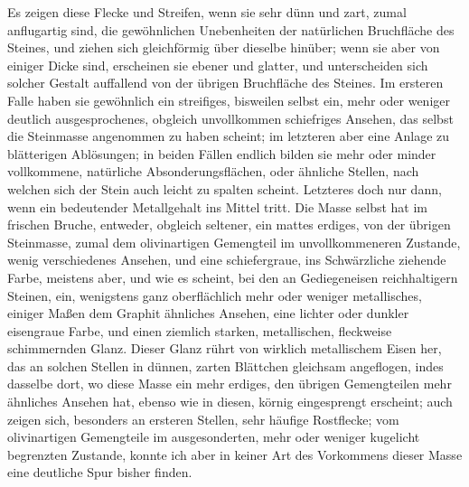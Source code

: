 \documentclass[a4paper, 11pt, oneside, german]{article}
\begin{document}
Es zeigen diese Flecke und Streifen, wenn sie sehr dünn und zart, zumal anflugartig sind, die gewöhnlichen Unebenheiten der natürlichen Bruchfläche des Steines, und ziehen sich gleichförmig über dieselbe hinüber; wenn sie aber von einiger Dicke sind, erscheinen sie ebener und glatter, und unterscheiden sich solcher Gestalt auffallend von der übrigen Bruchfläche des Steines. Im ersteren Falle haben sie gewöhnlich ein streifiges, bisweilen selbst ein, mehr oder weniger deutlich ausgesprochenes, obgleich unvollkommen schiefriges Ansehen, das selbst die Steinmasse angenommen zu haben scheint; im letzteren aber eine Anlage zu blätterigen Ablösungen; in beiden Fällen endlich bilden sie mehr oder minder vollkommene, natürliche Absonderungsflächen, oder ähnliche Stellen, nach welchen sich der Stein auch leicht zu spalten scheint. Letzteres doch nur dann, wenn ein bedeutender Metallgehalt ins Mittel tritt. Die Masse selbst hat im frischen Bruche, entweder, obgleich seltener, ein mattes erdiges, von der übrigen Steinmasse, zumal dem olivinartigen Gemengteil im unvollkommeneren Zustande, wenig verschiedenes Ansehen, und eine schiefergraue, ins Schwärzliche ziehende Farbe, meistens aber, und wie es scheint, bei den an Gediegeneisen reichhaltigern Steinen, ein, wenigstens ganz oberflächlich mehr oder weniger metallisches, einiger Maßen dem Graphit ähnliches Ansehen, eine lichter oder dunkler eisengraue Farbe, und einen ziemlich starken, metallischen, fleckweise schimmernden Glanz. Dieser Glanz rührt von wirklich metallischem Eisen her, das an solchen Stellen in dünnen, zarten Blättchen gleichsam angeflogen, indes dasselbe dort, wo diese Masse ein mehr erdiges, den übrigen Gemengteilen mehr ähnliches Ansehen hat, ebenso wie in diesen, körnig eingesprengt erscheint; auch zeigen sich, besonders an ersteren Stellen, sehr häufige Rostflecke; vom olivinartigen Gemengteile im ausgesonderten, mehr oder weniger kugelicht begrenzten Zustande, konnte ich aber in keiner Art des Vorkommens dieser Masse eine deutliche Spur bisher finden.
\end{document}
